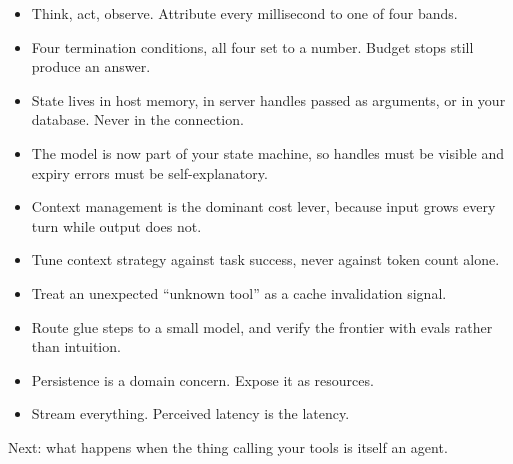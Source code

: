\begin{itemize}[leftmargin=1.6em, itemsep=3pt]
\item Think, act, observe. Attribute every millisecond to one of four bands.
\item Four termination conditions, all four set to a number. Budget stops still
produce an answer.
\item State lives in host memory, in server handles passed as arguments, or in
your database. Never in the connection.
\item The model is now part of your state machine, so handles must be visible and
expiry errors must be self-explanatory.
\item Context management is the dominant cost lever, because input grows every
turn while output does not.
\item Tune context strategy against task success, never against token count
alone.
\item Treat an unexpected ``unknown tool'' as a cache invalidation signal.
\item Route glue steps to a small model, and verify the frontier with evals
rather than intuition.
\item Persistence is a domain concern. Expose it as resources.
\item Stream everything. Perceived latency is the latency.
\end{itemize}

Next: what happens when the thing calling your tools is itself an agent.
